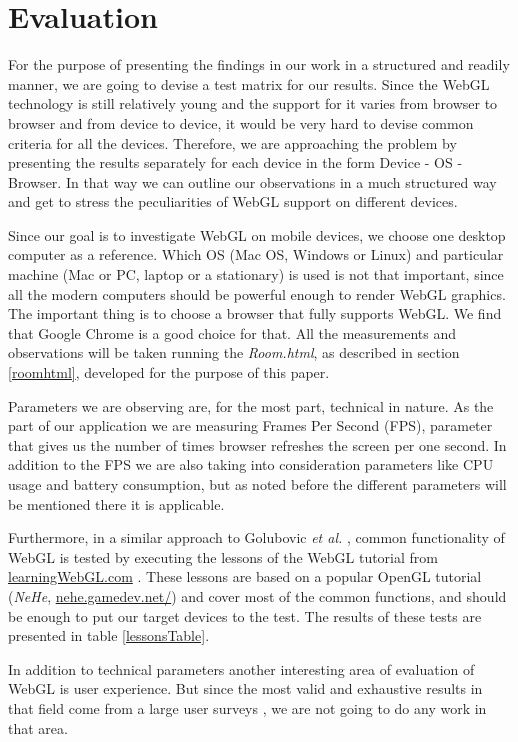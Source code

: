\documentclass[12pt,journal,compsoc]{IEEEtran}
\begin{document}
\section{Evaluation}
For the purpose of presenting the findings in our work in a structured and readily manner, we are going to devise a test matrix for our results. Since the WebGL technology is still relatively young and the support for it varies from browser to browser and from device to device, it would be very hard to devise common criteria for all the devices. Therefore,  we are approaching the problem by presenting the results separately for each device in the form Device - OS - Browser. In that way we can outline our observations in a much structured way and get to stress the peculiarities of WebGL support on different devices.

Since our goal is to investigate WebGL on mobile devices, we choose one desktop computer as a reference. Which OS (Mac OS, Windows or Linux) and particular machine (Mac or PC, laptop or a stationary) is used is not that important, since all the modern computers should be powerful enough to render WebGL graphics. The important thing is to choose a browser that fully supports WebGL. We find that Google Chrome is a good choice for that. All the measurements and observations will be taken running the \textit{Room.html}, as described in section \ref{roomhtml}, developed for the purpose of this paper.

Parameters we are observing are, for the most part, technical in nature. As the part of our application we are measuring Frames Per Second (FPS), parameter that gives us the number of times browser refreshes the screen per one second. In addition to the FPS we are also taking into consideration parameters like CPU usage and battery consumption, but as noted before the different parameters will be mentioned there it is applicable. 

Furthermore, in a similar approach to Golubovic \textit{et al.} \cite{Golubovic2011}, common functionality of WebGL is tested by executing the lessons of the WebGL tutorial from \url{learningWebGL.com} \cite{learningwebgl}. These lessons are based on a popular OpenGL tutorial (\textit{NeHe}, \url{nehe.gamedev.net/}) and cover most of the common functions, and should be enough to put our target devices to the test. The results of these tests are presented in table \ref{lessonsTable}.
 
In addition to technical parameters another interesting area of evaluation of WebGL is user experience. But since the most valid and exhaustive results in that field come from a large user surveys  \cite{Olsson2011b}, we are not going to do any work in that area.
\end{document}
